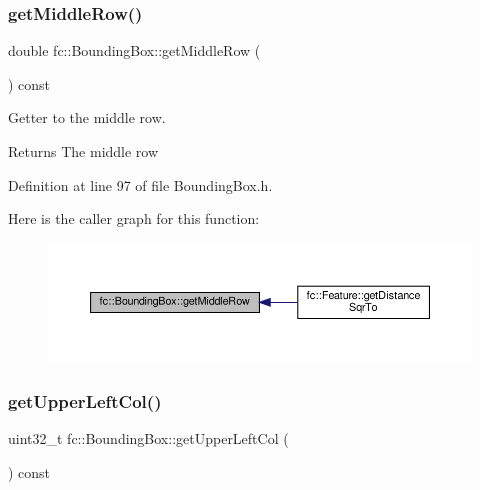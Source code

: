 \subsubsection{\texorpdfstring{get\+Middle\+Row()}{getMiddleRow()}}
{\footnotesize\ttfamily double fc\+::\+Bounding\+Box\+::get\+Middle\+Row (\begin{DoxyParamCaption}{ }\end{DoxyParamCaption}) const\hspace{0.3cm}{\ttfamily [inline]}}



Getter to the middle row. 

\begin{DoxyReturn}{Returns}
The middle row 
\end{DoxyReturn}


Definition at line 97 of file Bounding\+Box.\+h.

Here is the caller graph for this function\+:
\nopagebreak
\begin{figure}[H]
\begin{center}
\leavevmode
\includegraphics[width=350pt]{db/dc1/classfc_1_1BoundingBox_a96d9180aacc790de07f07dde841e9d01_icgraph}
\end{center}
\end{figure}
\mbox{\label{classfc_1_1BoundingBox_a21e8dcad0b3d37aa0a37c6dab4200974}} 
\subsubsection{\texorpdfstring{get\+Upper\+Left\+Col()}{getUpperLeftCol()}}
{\footnotesize\ttfamily uint32\+\_\+t fc\+::\+Bounding\+Box\+::get\+Upper\+Left\+Col (\begin{DoxyParamCaption}{ }\end{DoxyParamCaption}) const\hspace{0.3cm}{\ttfamily [inline]}}



